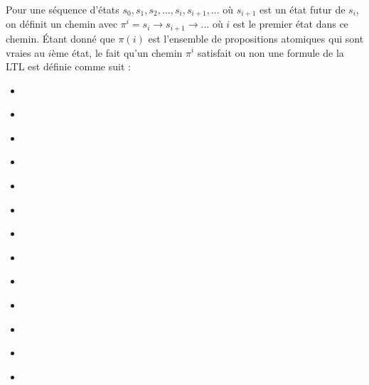 Pour une séquence d'états $s_0, s_1, s_2, ..., s_i, s_{i + 1}, ... $ où $s_{i + 1}$ est un état futur de $s_i$, on définit un chemin avec $\pi^i = s_i \rightarrow s_{i + 1} \rightarrow ... $ où $i$ est le premier état dans ce chemin. Étant donné que $\pi(i)$ est l'ensemble de propositions atomiques qui sont vraies au $i$ème état, le fait qu'un chemin $\pi^i$ satisfait ou non une formule de la LTL est définie comme suit \citep{rozier2011linear}:

\begin{itemize}
  \item {} \label{eq:true}
  \item {} \label{eq:false}
  \item {} \label{eq:ap}
  \item {} \label{eq:not}
  \item {} \label{eq:and}
  \item {} \label{eq:or}
  \item {} \label{eq:then}
  \item {} \label{eq:next}
  \item {} \label{eq:global}
  \item {} \label{eq:future}
  \item {} \label{eq:until}
  \item {} \label{eq:wuntil}
  \item {} \label{eq:release}
\end{itemize}

